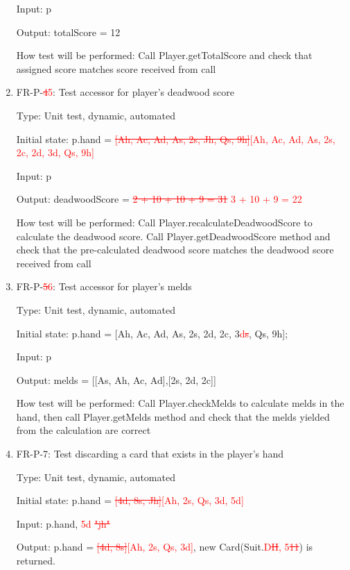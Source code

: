 \documentclass[12pt, titlepage]{article}
\begin{document}
\begin{enumerate}
    Input: p
    
    Output: totalScore = 12
    
    How test will be performed: Call Player.getTotalScore and check that assigned score matches score received from call
    
    \item{FR-P-\textcolor{red}{\sout{4}5}: Test accessor for player's deadwood score}
    
    Type: Unit test, dynamic, automated
    					
    Initial state: p.hand = \textcolor{red}{\sout{[Ah, Ac, Ad, As, 2s, Jh, Qs, 9h]}[Ah, Ac, Ad, As, 2s, 2c, 2d, 3d, Qs, 9h]}
    
    Input: p
    
    Output: deadwoodScore = \textcolor{red}{\sout{2 + 10 + 10 + 9 = 31} 3 + 10 + 9 = 22}
    
    How test will be performed: Call Player.recalculateDeadwoodScore to calculate the deadwood score. Call Player.getDeadwoodScore method and check that the pre-calculated deadwood score matches the deadwood score received from call
    
    \item{FR-P-\textcolor{red}{\sout{5}6}: Test accessor for player's melds}
    
    Type: Unit test, dynamic, automated
    					
    Initial state: p.hand = [Ah, Ac, Ad, As, 2s, 2d, 2c, 3\textcolor{red}{d\sout{s}}, Qs, 9h];
    
    Input: p
    
    Output: melds = [[As, Ah, Ac, Ad],[2s, 2d, 2c]]
    
    How test will be performed: Call Player.checkMelds to calculate melds in the hand, then call Player.getMelds method and check that the melds yielded from the calculation are correct
    
    \item{FR-P-7: Test discarding a card that exists in the player's hand}
    
    Type: Unit test, dynamic, automated
    					
    Initial state: p.hand = \textcolor{red}{\sout{[4d, 8s, Jh]}[Ah, 2s, Qs, 3d, 5d]}
    
    Input: p.hand, \textcolor{red}{5d \sout{"jh"}}
    
    Output: p.hand = \textcolor{red}{\sout{[4d, 8s]}[Ah, 2s, Qs, 3d]}, new Card(Suit.\textcolor{red}{D\sout{H}, 5\sout{11}}) is returned.
    

\end{enumerate}
\end{document}
